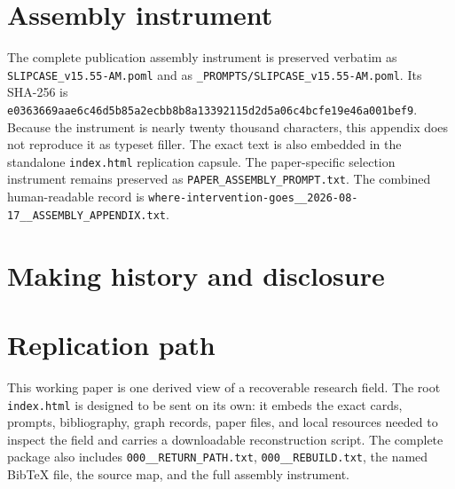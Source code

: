 \documentclass[11pt]{article}
\begin{document}
\appendix
\section{Assembly instrument}
The complete publication assembly instrument is preserved verbatim as \texttt{SLIPCASE\_v15.55-AM.poml} and as \texttt{\_PROMPTS/SLIPCASE\_v15.55-AM.poml}. Its SHA-256 is \nolinkurl{e0363669aae6c46d5b85a2ecbb8b8a13392115d2d5a06c4bcfe19e46a001bef9}. Because the instrument is nearly twenty thousand characters, this appendix does not reproduce it as typeset filler. The exact text is also embedded in the standalone \texttt{index.html} replication capsule. The paper-specific selection instrument remains preserved as \texttt{PAPER\_ASSEMBLY\_PROMPT.txt}. The combined human-readable record is \texttt{where-intervention-goes\_\_2026-08-17\_\_ASSEMBLY\_APPENDIX.txt}.

\section{Making history and disclosure}

\section{Replication path}
This working paper is one derived view of a recoverable research field. The root \texttt{index.html} is designed to be sent on its own: it embeds the exact cards, prompts, bibliography, graph records, paper files, and local resources needed to inspect the field and carries a downloadable reconstruction script. The complete package also includes \texttt{000\_\_RETURN\_PATH.txt}, \texttt{000\_\_REBUILD.txt}, the named BibTeX file, the source map, and the full assembly instrument.
\vspace{1em}
\end{document}
